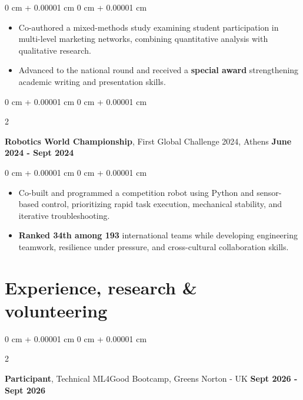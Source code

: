 \documentclass[10pt, letterpaper]{article}
\newenvironment{highlights}{
    \begin{itemize}[
        topsep=0.10 cm,
        parsep=0.10 cm,
        partopsep=0pt,
        itemsep=0pt,
        leftmargin=0 cm + 10pt
    ]
}{
    \end{itemize}
} %
\newenvironment{onecolentry}{
    \begin{adjustwidth}{
        0 cm + 0.00001 cm
    }{
        0 cm + 0.00001 cm
    }
}{
    \end{adjustwidth}
} %
\newenvironment{twocolentry}[2][]{
    \onecolentry
    \def\secondColumn{#2}
    \setcolumnwidth{\fill, 4.5 cm}
    \begin{paracol}{2}
}{
    \switchcolumn \raggedleft \secondColumn
    \end{paracol}
    \endonecolentry
} %
\begin{document}
        \vspace{0.1 cm}

        \begin{onecolentry}
            \begin{highlights}
                \item Co-authored a mixed-methods study examining student participation in multi-level marketing networks, combining quantitative analysis with qualitative research.
                \item Advanced to the national round and received a \textbf{special award} strengthening academic writing and presentation skills.
            \end{highlights}
        \end{onecolentry}

        \vspace{0.2 cm}

        \begin{twocolentry}{
        \textbf{June 2024 - Sept 2024}
        }
            \textbf{Robotics World Championship}, First Global Challenge 2024, Athens\end{twocolentry}

        \vspace{0.1 cm}

        \begin{onecolentry}
            \begin{highlights}
                \item Co-built and programmed a competition robot using Python and sensor-based control, prioritizing rapid task execution, mechanical stability, and iterative troubleshooting.
                \item \textbf{Ranked 34th among 193} international teams while developing engineering teamwork, resilience under pressure, and cross-cultural collaboration skills.
            \end{highlights}
        \end{onecolentry}

        \vspace{0.2 cm}

    \section{Experience, research \& volunteering}
  
        \begin{twocolentry}{
        \textbf{Sept 2026 - Sept 2026}
        }
            \textbf{Participant}, Technical ML4Good Bootcamp, Greens Norton - UK\end{twocolentry}
\end{document}
